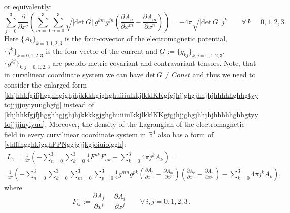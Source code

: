 \documentclass{article}
\theoremstyle{definition}
\theoremstyle{remark}
\newcommand{\er}{\eqref}
\newcommand{\er}{\eqref}
\begin{document}
or equivalently:
\begin{equation}\label{khjhhkfgjfjhgghhgjghjhjkkkkgjghghuiiiulkkjlkklKKgfgjhjjghgjhhjhjhhhhhghhgtyytojjjjjuyiyuughgfghhjkkhj}
\sum_{j=0}^{3}\frac{\partial}{\partial
x^j}\left(\sum_{m=0}^{3}\sum_{n=0}^{3}\sqrt{|\text{det}\,G|}\,g^{km}g^{jn}\left(\frac{\partial
A_n}{\partial x^m}-\frac{\partial A_m}{\partial x^n}\right)\right)
=-4\pi \sqrt{|\text{det}\,G|}\, j^k\quad\quad\forall\, k=0,1,2,3.
\end{equation}
Here $\{A_k\}_{k=0,1,2,3}$ is the four-covector of the
electromagnetic potential, $\{j^k\}_{k=0,1,2,3}$ is the four-vector
of the current and $G:=\{g_{kj}\}_{k,j=0,1,2,3}$,
$\{g^{kj}\}_{k,j=0,1,2,3}$ are pseudo-metric covariant and
contravariant tensors. Note, that in curvilinear coordinate system
we can have $\text{det}\,G\neq Const$ and thus we need to consider
the enlarged form
\er{khjhhkfgjfjhgghhgjghjhjkkkkgjghghuiiiulkkjlkklKKgfgjhjjghgjhhjhjhhhhhghhgtyytojjjjjuyiyuughgfg}
instead of
\er{khjhhkfgjfjhgghhgjghjhjkkkkgjghghuiiiulkkjlkklKKgfgjhjjghgjhhjhjhhhhhghhgtyytojjjjjuyiyuu}.
Moreover, the density of the Lagrangian of the electromagnetic field
in every curvilinear coordinate system in $\mathbb{R}^4$ also has a
form of \er{vhfffngghkjgghPPNggjgjjkgjoiuioiggh}:
\begin{multline}\label{vhfffngghkjgghPPNggjgjjkgjoiuioigghjhhh}
L_1=\frac{1}{4\pi}\left(-\sum_{n=0}^{3}\sum_{k=0}^{3}\frac{1}{4}F^{nk}F_{nk}-\sum_{k=0}^{3}4\pi
j^k A_k\right)=\\
\frac{1}{4\pi}\left(-\sum_{n=0}^{3}\sum_{k=0}^{3}\sum_{m=0}^{3}\sum_{p=0}^{3}\frac{1}{4}g^{mn}g^{pk}\left(\frac{\partial
A_p}{\partial x^m}-\frac{\partial A_m}{\partial
x^p}\right)\left(\frac{\partial A_k}{\partial x^n}-\frac{\partial
A_n}{\partial x^k}\right)-\sum_{k=0}^{3}4\pi j^k A_k\right),
\end{multline}
where
\begin{equation}\label{huohuioy89gjjhjffffff3478zzrrZZZhjhhjhhjjhhffGGhjjhjhhjhj}
F_{ij}:=\frac{\partial A_j}{\partial x^i}-\frac{\partial
A_i}{\partial x^j}\quad\quad\forall\, i,j=0,1,2,3\,.
\end{equation}
\end{document}
